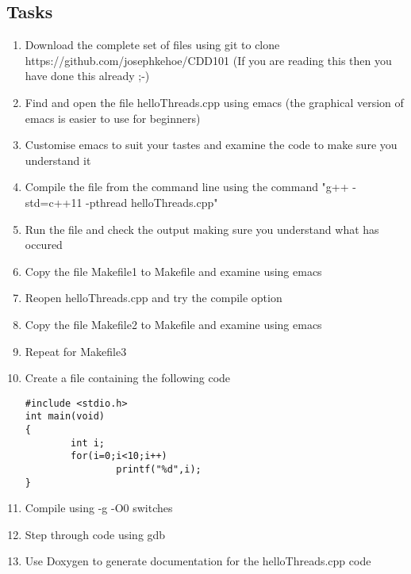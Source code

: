 \documentclass[10pt,a4paper]{article}
\begin{document}
\subsection{Tasks}
\begin{enumerate}
\item Download the complete set of files using git to clone https://github.com/josephkehoe/CDD101
(If you are reading this then you have done this already ;-)
\item  	Find and open the file helloThreads.cpp using emacs (the graphical version of emacs is easier to use for beginners)
\item	Customise emacs to suit your tastes and examine the code to make sure you understand it
\item 	Compile the file from the command line using the command "g++ -std=c++11 -pthread helloThreads.cpp"
\item	Run the file and check the output making sure you understand what has occured
\item	Copy the file Makefile1 to Makefile and examine using emacs
\item	Reopen helloThreads.cpp and try the compile option
\item	Copy the file Makefile2 to Makefile and examine using emacs
\item	Repeat for Makefile3
\item	Create a file containing the following code


\begin{verbatim}
#include <stdio.h>
int main(void)
{
        int i;
        for(i=0;i<10;i++)
                printf("%d",i);
}
\end{verbatim}



\item	Compile using -g -O0 switches
\item	Step through code using gdb
\item	Use Doxygen to generate documentation for the helloThreads.cpp code
\end{enumerate}
\end{document}

